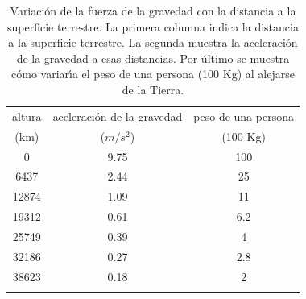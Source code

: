 \bigskip
\begin{table}[h]
\begin{center}
\footnotesize
\begin{tabular}{ccc}
\toprule
altura	& aceleraci\'on de la gravedad & peso de una persona \\
(km)    &   ($m/s^2$)   			   &  (100 Kg)           \\
\midrule
0	& 9.75 		& 100	\\
6437& 2.44 		& 25	\\
12874& 1.09   	& 11	\\
19312& 0.61  	& 6.2	\\
25749& 0.39   	& 4	\\
32186& 0.27  	& 2.8	\\
38623& 0.18   	& 2	\\
\addlinespace
\bottomrule
\end{tabular}
\end{center}
\caption{Variaci\'on de la fuerza de la gravedad con la distancia a la superficie terrestre. La primera columna indica la distancia a la superficie terrestre. La segunda muestra la aceleraci\'on de la gravedad a esas distancias. Por \'ultimo se muestra c\'omo variar\'\i{}a el peso de una persona (100 Kg) al alejarse de la Tierra.}
  \label{tab:gravedad_altura}
\end{table}

